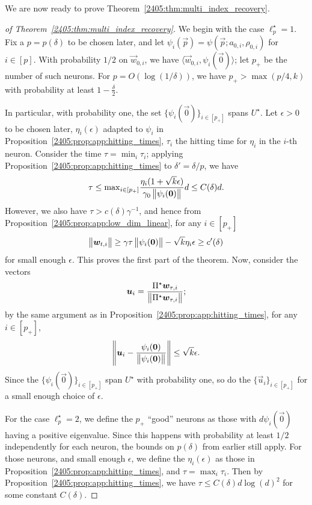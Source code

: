 We are now ready to prove Theorem~\ref{2405:thm:multi_index_recovery}. 
\begin{proof}[of Theorem~\ref{2405:thm:multi_index_recovery}]
    We begin with the case $\ell_p^\star = 1$. Fix a $p = p(\delta)$ to be chosen later, and let $\psi_i(\vec{p}) = \psi(\vec{p}; a_{0, i}, \rho_{0, i})$ for $i \in [p]$. With probability $1/2$ on $\vec{w}_{0, i}$, we have $\langle \vec{w}_{0, i}, \psi_i(\vec{0}) \rangle$; let $p_+$ be the number of such neurons. For $p = O(\log(1/\delta))$, we have $p_+ > \max(p/4, k)$ with probability at least $1 - \frac\delta2$.

    In particular, with probability one, the set $\{ \psi_i(\vec{0}) \}_{i\in [p_+]}$ spans $U^\star$. Let $\epsilon > 0$ to be chosen later, $\eta_i(\epsilon)$ adapted to $\psi_i$ in Proposition~\ref{2405:prop:app:hitting_times}, $\tau_i$ the hitting time for $\eta_i$ in the $i$-th neuron. Consider the time $\tau = \min_i \tau_i$; applying Proposition~\ref{2405:prop:app:hitting_times} to $\delta' = \delta/p$, we have
    \[ \tau \leq {\rm max}_{i \in [p_+]} \frac{\eta_i(1 + \sqrt{k}\epsilon)}{\gamma_0 \left\lVert \psi_i({\boldsymbol{0}})\right\rVert} d \leq C(\delta) d. \]
    However, we also have $\tau > c(\delta) \gamma^{-1}$, and hence from Proposition~\ref{2405:prop:app:low_dim_linear}, for any $i \in [p_+]$
    \[ \left\lVert {\boldsymbol{w}}_{t, i}\right\rVert \geq \gamma \tau \left\lVert \psi_i({\boldsymbol{0}})\right\rVert - \sqrt{k}\eta_i\epsilon \geq c'(\delta) \]
    for small enough $\epsilon$. This proves the first part of the theorem. Now, consider the vectors
    \[ {\boldsymbol{u}}_i = \frac{\Pi^\star {\boldsymbol{w}}_{\tau, i}}{\left\lVert \Pi^\star {\boldsymbol{w}}_{\tau, i}\right\rVert}; \]
    by the same argument as in Proposition~\ref{2405:prop:app:hitting_times}, for any $i \in [p_+]$,
    \[ \left\lVert {\boldsymbol{u}}_i - \frac{\psi_i({\boldsymbol{0}})}{\left\lVert \psi_i({\boldsymbol{0}})\right\rVert}\right\rVert \leq \sqrt{k}\epsilon. \]
    Since the $\{\psi_i(\vec{0})\}_{i\in[p_+]}$ span $U^\star$ with probability one, so do the $\{\vec{u}_i\}_{i \in [p_+]}$ for a small enough choice of $\epsilon$.

    For the case $\ell_p^\star = 2$, we define the $p_+$ ``good'' neurons as those with $d\psi_i(\vec{0})$ having a positive eigenvalue. Since this happens with probability at least $1/2$ independently for each neuron, the bounds on $p(\delta)$ from earlier still apply.
    For those neurons, and small enough $\epsilon$, we define the $\eta_i(\epsilon)$ as those in Proposition~\ref{2405:prop:app:hitting_times}, and $\tau = \max_i \tau_i$. Then by Proposition~\ref{2405:prop:app:hitting_times}, we have $\tau \leq C(\delta)d\log(d)^2$ for some constant $C(\delta)$.


\end{proof}
